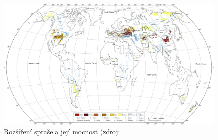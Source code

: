 \begin{landscape}
	\begin{figure}
		\centering
		\includegraphics[width=1\linewidth]{obrazky/eolicka/loes_distr}
		\caption{Rozšíření spraše a její mocnost (zdroj: \textcite{liLoessGenesisWorldwide2020}}
		\label{fig:spras_distribuce}
	\end{figure}
\end{landscape}


%		
%
%	
